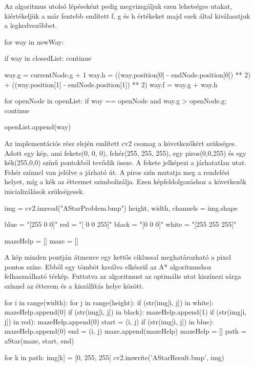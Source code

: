 Az algoritmus utolsó lépéseként pedig megvizsgáljuk ezen lehetséges utakat, kiértékeljük a már fentebb említett f, g és h értékeket majd ezek által kiválasztjuk a legkedvezőbbet.
\begin{python}
for way in newWay:

    if way in closedList:
        continue

    way.g = currentNode.g + 1
    way.h = ((way.position[0] - endNode.position[0]) ** 2) + 
    		((way.position[1] - endNode.position[1]) ** 2)
    way.f = way.g + way.h

    for openNode in openList:
        if way == openNode and way.g > openNode.g:
            continue

    openList.append(way)
\end{python}

Az implementációs rész elején említett cv2 csomag a következőkért szükséges. Adott egy kép, ami fekete(0, 0, 0), fehér(255, 255, 255), egy piros(0,0,255) és egy kék(255,0,0) színű pontokból tevődik össze. A fekete jelképezi a járhatatlan utat. Fehér színnel van jelölve a járható út. A piros szín mutatja meg a rendelési helyet, míg a kék az éttermet szimbolizálja. Ezen képfeldolgozáshoz a következők inicializálások szükségesek.

\begin{python}
img = cv2.imread("AStarProblem.bmp")
height, width, channels = img.shape

blue = "[255   0   0]"
red = "[  0   0 255]"
black = "[0 0 0]"
white = "[255 255 255]"
    
mazeHelp = []
maze = []
\end{python}

A kép minden pontján átmenve egy kettős ciklussal meghatározható a pixel pontos színe. Ebből egy tömböt kreálva elkészül az A* algoritmushoz felhasználható térkép. Futtatva az algoritmust az optimális utat kiszínezi sárga színnel az étterem és a kiszállítás helye között.

\begin{python}
for i in range(width):
    for j in range(height):
        if (str(img[i, j]) in white):
            mazeHelp.append(0)
        if (str(img[i, j]) in black):
            mazeHelp.append(1)
        if (str(img[i, j]) in red):
            mazeHelp.append(0)
            start = (i, j)
        if (str(img[i, j]) in blue):
            mazeHelp.append(0)
            end = (i, j)
    maze.append(mazeHelp)
    mazeHelp = []
path = aStar(maze, start, end)

for k in path:
    img[k] = [0, 255, 255]
cv2.imwrite('AStarResult.bmp', img)
\end{python}

